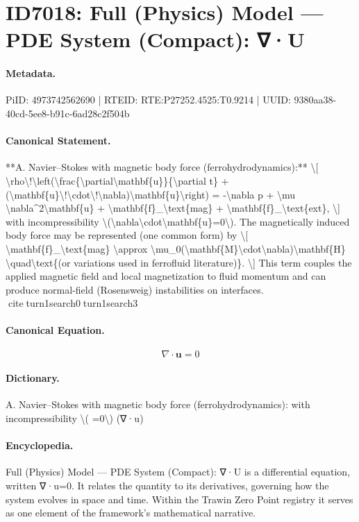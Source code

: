 \section*{ID7018: Full (Physics) Model — PDE System (Compact): ∇·U}
\paragraph{Metadata.}
PiID: 4973742562690 | RTEID: RTE:P27252.4525:T0.9214 | UUID: 9380aa38-40cd-5ee8-b91c-6ad28c2f504b

\paragraph{Canonical Statement.}
**A. Navier–Stokes with magnetic body force (ferrohydrodynamics):** \textbackslash{}[ \textbackslash{}rho\textbackslash{}!\textbackslash{}left(\textbackslash{}frac\{\textbackslash{}partial\textbackslash{}mathbf\{u\}\}\{\textbackslash{}partial t\} + (\textbackslash{}mathbf\{u\}\textbackslash{}!\textbackslash{}cdot\textbackslash{}!\textbackslash{}nabla)\textbackslash{}mathbf\{u\}\textbackslash{}right) = -\textbackslash{}nabla p + \textbackslash{}mu \textbackslash{}nabla\textasciicircum{}2\textbackslash{}mathbf\{u\} + \textbackslash{}mathbf\{f\}\_\textbackslash{}text\{mag\} + \textbackslash{}mathbf\{f\}\_\textbackslash{}text\{ext\}, \textbackslash{}] with incompressibility \textbackslash{}(\textbackslash{}nabla\textbackslash{}cdot\textbackslash{}mathbf\{u\}=0\textbackslash{}). The magnetically induced body force may be represented (one common form) by \textbackslash{}[ \textbackslash{}mathbf\{f\}\_\textbackslash{}text\{mag\} \textbackslash{}approx \textbackslash{}mu\_0(\textbackslash{}mathbf\{M\}\textbackslash{}cdot\textbackslash{}nabla)\textbackslash{}mathbf\{H\} \textbackslash{}quad\textbackslash{}text\{(or variations used in ferrofluid literature)\}. \textbackslash{}] This term couples the applied magnetic field and local magnetization to fluid momentum and can produce normal-field (Rosensweig) instabilities on interfaces. citeturn1search0turn1search3

\paragraph{Canonical Equation.}
\[
\nabla\cdot\mathbf{u}=0
\]

\paragraph{Dictionary.}
A. Navier–Stokes with magnetic body force (ferrohydrodynamics): with incompressibility \textbackslash{}( =0\textbackslash{}) (∇·u)

\paragraph{Encyclopedia.}
Full (Physics) Model — PDE System (Compact): ∇·U is a differential equation, written ∇·u=0. It relates the quantity to its derivatives, governing how the system evolves in space and time. Within the Trawin Zero Point registry it serves as one element of the framework's mathematical narrative.
